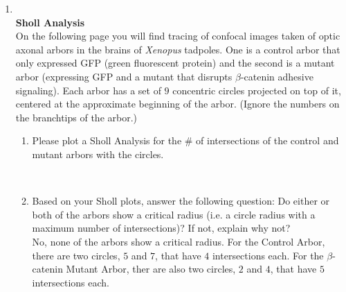\documentclass[11pt]{article}
\begin{document}
\begin{enumerate}[label=\arabic*.]
\newpage
\item
\underline{}
\\
\textbf{Sholl Analysis}
\\
On the following page you will find tracing of confocal images taken of optic axonal arbors in the brains of \textit{Xenopus} tadpoles. One is a control arbor that only expressed GFP (green fluorescent protein) and the second is a mutant arbor (expressing GFP and a mutant that disrupts $\beta$-catenin adhesive signaling). Each arbor has a set of $9$ concentric circles projected on top of it, centered at the approximate beginning of the arbor. (Ignore the numbers on the branchtips of the arbor.)
\begin{enumerate}[label=(\alph*)]
\item
Please plot a Sholl Analysis for the \# of intersections of the control and mutant arbors with the circles.
\vspace*{1\baselineskip}
\\
\\



\item
Based on your Sholl plots, answer the following question: Do either or both of the arbors show a critical radius (i.e. a circle radius with a maximum number of intersections)? If not, explain why not?
\vspace*{1\baselineskip}
\\
No, none of the arbors show a critical radius. For the Control Arbor, there are two circles, $5$ and $7$, that have $4$ intersections each. For the $\beta$-catenin Mutant Arbor, ther are also two circles, $2$ and $4$, that have $5$ intersections each.




\end{enumerate}
\end{enumerate}
\end{document}
